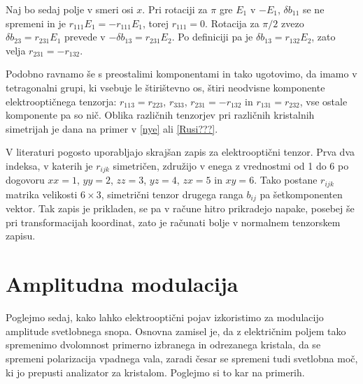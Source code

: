 Naj bo sedaj polje v smeri osi $x$. Pri rotaciji za $\pi$ gre $E_{1}$
v $-E_{1}$, $\delta b_{11}$ se ne spremeni in je $r_{111}E_{1}=-r_{111}E_{1}$,
torej $r_{111}=0$. Rotacija za $\pi/2$ zvezo $\delta b_{23}=r_{231}E_{1}$
prevede v $-\delta b_{13}=r_{231}E_{2}$. Po definiciji pa je $\delta b_{13}=r_{132}E_{2}$,
zato velja $r_{231}=-r_{132}$.

Podobno ravnamo še s preostalimi komponentami in tako ugotovimo, da
imamo v tetragonalni grupi, ki vsebuje le štirištevno os, štiri neodvisne
komponente elektrooptičnega tenzorja: $r_{113}=r_{223}$, $r_{333}$,
$r_{231}=-r_{132}$ in $r_{131}=r_{232}$, vse ostale komponente pa
so nič. Oblika različnih tenzorjev pri različnih kristalnih simetrijah
je dana na primer v \ref{nye} ali \ref{Rusi???}.

V literaturi pogosto uporabljajo skrajšan zapis za elektrooptični
tenzor. Prva dva indeksa, v katerih je $r_{ijk}$ simetričen, združijo
v enega z vrednostmi od 1 do 6 po dogovoru $xx=1$, $yy=2$, $zz=3$,
$yz=4$, $zx=5$ in $xy=6$. Tako postane $r_{ijk}$ matrika velikosti
$6\times3$, simetrični tenzor drugega ranga $b_{ij}$ pa šetkomponenten
vektor. Tak zapis je prikladen, se pa v račune hitro prikradejo napake,
posebej še pri transformacijah koordinat, zato je računati bolje v
normalnem tenzorskem zapisu.


\section{Amplitudna modulacija}

Poglejmo sedaj, kako lahko elektrooptični pojav izkoristimo za modulacijo
amplitude svetlobnega snopa. Osnovna zamisel je, da z električnim
poljem tako spremenimo dvolomnost primerno izbranega in odrezanega
kristala, da se spremeni polarizacija vpadnega vala, zaradi česar
se spremeni tudi svetlobna moč, ki jo prepusti analizator za kristalom.
Poglejmo si to kar na primerih.

